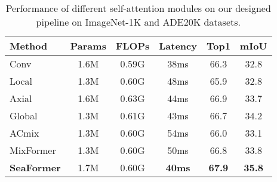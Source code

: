 \begin{table}

    \centering
    \small


        \begin{tabular}{l | c | c| c| c| c}
        \hline
        
        \hline

        \hline
        Method     & Params   & FLOPs   & Latency     & Top1    &  mIoU  \\
        \hline

        \hline
        \hline
        Conv  &  1.6M  & 0.59G  & 38ms &  66.3  & 32.8 \\
        Local & 1.3M  &  0.60G  & 48ms &  65.9 & 32.8  \\
        Axial & 1.6M  &  0.63G  & 44ms &  66.9 & 33.7  \\
        Global & 1.3M & 0.61G  & 43ms & 66.7 & 34.2 \\
        ACmix &   1.3M  & 0.60G & 54ms & 66.0 & 33.1 \\
        MixFormer &   1.3M & 0.60G  & 50ms & 66.8 & 33.8 \\
        \textbf{SeaFormer} & 1.7M & 0.60G & \textbf{40ms}  & \textbf{67.9}  & \textbf{35.8}  \\
        \hline

        \hline

        \hline
    \end{tabular}
    \caption{Performance of different self-attention modules on our designed pipeline on ImageNet-1K and ADE20K datasets. 
    }
    \label{table_attn}
\vspace{-0.1cm}
\end{table}